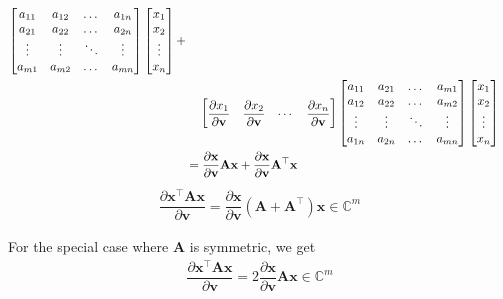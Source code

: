 \documentclass{article}
\newcommand{\trans}{\top}
\begin{document}
\begin{align}
\begin{bmatrix}
        a_{11} & a_{12} & \dots & a_{1n} \\
        a_{21} & a_{22} & \dots & a_{2n} \\
        \vdots & \vdots & \ddots & \vdots \\
        a_{m1} & a_{m2} & \dots & a_{mn} \\
    \end{bmatrix}
    \begin{bmatrix}
        x_{1} \\ x_{2} \\ \vdots \\ x_{n}
    \end{bmatrix} + \nonumber \\
    & \hspace{2.5ex} \begin{bmatrix}
        \dfrac{\partial x_{1}}{\partial \mathbf{v}} & \dfrac{\partial x_{2}}{\partial \mathbf{v}} & \cdots  & \dfrac{\partial x_{n}}{\partial \mathbf{v}}
     \end{bmatrix}
     \begin{bmatrix}
         a_{11} & a_{21} & \dots & a_{m1} \\
         a_{12} & a_{22} & \dots & a_{m2} \\
         \vdots & \vdots & \ddots & \vdots \\
         a_{1n} & a_{2n} & \dots & a_{mn} \\
     \end{bmatrix}
     \begin{bmatrix}
         x_{1} \\ x_{2} \\ \vdots \\ x_{n}
     \end{bmatrix} \\
     & = \dfrac{\partial \mathbf{x}}{\partial \mathbf{v}}\mathbf{A} \mathbf{x} + \dfrac{\partial \mathbf{x}}{\partial \mathbf{v}}\mathbf{A}^\trans \mathbf{x}
\end{align}
\begin{align}
    \boxed{\dfrac{\partial \mathbf{x}^\trans \mathbf{A} \mathbf{x}}{\partial \mathbf{v}} = \dfrac{\partial \mathbf{x}}{\partial \mathbf{v}}\left( \mathbf{A} + \mathbf{A}^\trans \right) \mathbf{x} \in \mathbb{C}^{m}}
\end{align}

For the special case where \(\mathbf{A}\) is symmetric, we get
\begin{align}
    \boxed{\dfrac{\partial \mathbf{x}^\trans \mathbf{A} \mathbf{x}}{\partial \mathbf{v}} = 2\dfrac{\partial \mathbf{x}}{\partial \mathbf{v}}\mathbf{A} \mathbf{x} \in \mathbb{C}^{m}}
\end{align}
\end{document}
